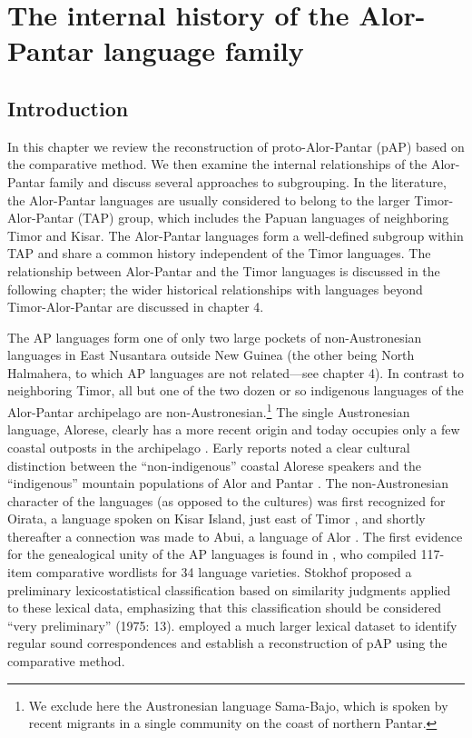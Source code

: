 
\chapter{The internal history of the Alor-Pantar language family}
 
\section{Introduction}
\hypertarget{Toc376957608}{}
In this chapter we review the reconstruction of proto-Alor-Pantar (pAP) based on the comparative method. We then examine the internal relationships of the Alor-Pantar family and discuss several approaches to subgrouping. In the literature, the Alor-Pantar languages are usually considered to belong to the larger Timor-Alor-Pantar (TAP) group, which includes the Papuan languages of neighboring Timor and Kisar. The Alor-Pantar languages form a well-defined subgroup within TAP and share a common history independent of the Timor languages. The relationship between Alor-Pantar and the Timor languages is discussed in the following chapter; the wider historical relationships with languages beyond Timor-Alor-Pantar are discussed in chapter 4. 

The AP languages form one of only two large pockets of non-Austronesian languages in East Nusantara outside New Guinea (the other being North Halmahera, to which AP languages are not related---see chapter 4). In contrast to neighboring Timor, all but one of the two dozen or so indigenous languages of the Alor-Pantar archipelago are non-Austronesian.\footnote{ We exclude here the Austronesian language Sama-Bajo, which is spoken by recent migrants in a single community on the coast of northern Pantar.} The single Austronesian language, Alorese, clearly has a more recent origin and today occupies only a few coastal outposts in the archipelago \citep{Klamer2011,Klamer2012}. Early reports noted a clear cultural distinction between the ``non-indigenous'' coastal Alorese speakers and the ``indigenous'' mountain populations of Alor and Pantar \citep[75-8]{Anonymous1914}. The non-Austronesian character of the languages (as opposed to the cultures) was first recognized for Oirata, a 
language spoken on Kisar Island, just east of Timor \citet{DeJong1937}, and shortly thereafter a connection was made to Abui, a language of Alor \citep{Nicolspeyer1940}. The first evidence for the genealogical unity of the AP languages is found in \citet{Stokhof1975}, who compiled 117-item comparative wordlists for 34 language varieties. Stokhof proposed a preliminary lexicostatistical classification based on similarity judgments applied to these lexical data, emphasizing that this classification should be considered ``very preliminary'' (1975: 13). \citep{HoltonEtAl2012} employed a much larger lexical dataset to identify regular sound correspondences and establish a reconstruction of pAP using the comparative method. 

